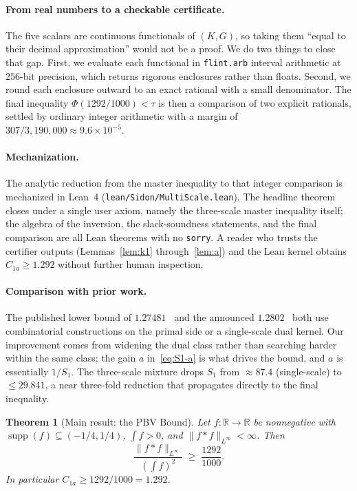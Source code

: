 \documentclass[11pt, letterpaper]{article}
\theoremstyle{plain}
\newtheorem{theorem}{Theorem}[section]
\theoremstyle{definition}
\newcommand{\R}{\mathbb{R}}
\newcommand{\Linf}{L^\infty}
\newcommand{\supp}{\operatorname{supp}}
\begin{document}
\paragraph{From real numbers to a checkable certificate.}
The five scalars are continuous functionals of $(K,G)$, so taking them
``equal to their decimal approximation'' would not be a proof.  We do
two things to close that gap.  First, we evaluate each functional in
\texttt{flint.arb} interval arithmetic at $256$-bit precision, which
returns rigorous enclosures rather than floats.  Second, we round each
enclosure outward to an exact rational with a small denominator.  The
final inequality $\Phi(1292/1000)<\tau$ is then a comparison of two
explicit rationals, settled by ordinary integer arithmetic with a
margin of $307/3{,}190{,}000\approx 9.6\times 10^{-5}$.

\paragraph{Mechanization.}
The analytic reduction from the master inequality to that integer
comparison is mechanized in Lean~4
(\texttt{lean/Sidon/MultiScale.lean}).  The headline theorem closes
under a single user axiom, namely the three-scale master inequality
itself; the algebra of the inversion, the slack-soundness statements,
and the final comparison are all Lean theorems with no \texttt{sorry}.
A reader who trusts the certifier outputs (Lemmas~\ref{lem:k1}
through~\ref{lem:a}) and the Lean kernel obtains $C_{1a}\ge 1.292$
without further human inspection.

\paragraph{Comparison with prior work.}
The published lower bound of $1.27481$~\cite{MV10} and the announced
$1.2802$~\cite{CS17} both use combinatorial constructions on the
primal side or a single-scale dual kernel.  Our improvement comes from
widening the dual class rather than searching harder within the same
class; the gain $a$ in~\eqref{eq:S1-a} is what drives the bound, and
$a$ is essentially $1/S_1$.  The three-scale mixture drops $S_1$ from
$\approx 87.4$ (single-scale) to $\le 29.841$, a near three-fold
reduction that propagates directly to the final inequality.

\begin{theorem}[Main result: the PBV Bound]
\label{thm:main}
Let $f:\R\to\R$ be nonnegative with
$\supp(f)\subseteq(-1/4,1/4)$, $\int f>0$, and
$\|f*f\|_{\Linf}<\infty$.  Then
\[
  \frac{\|f*f\|_{\Linf}}{\left(\int f\right)^2}
  \;\ge\;
  \frac{1292}{1000}.
\]
In particular $C_{1a}\ge 1292/1000=1.292$.
\end{theorem}
\end{document}
